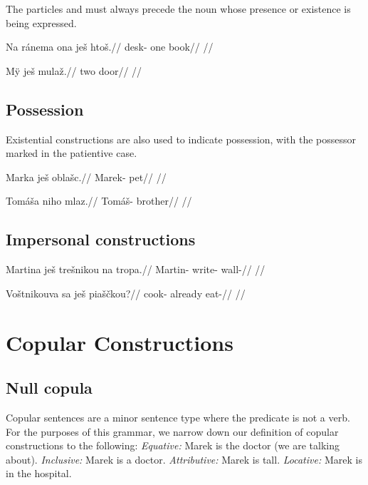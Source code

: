 The particles  and  must always precede the noun whose presence or existence is being expressed.

\pex
\begingl
\gla Na r\'anema ona je\v{s} hto\v{s}.//
\glb {} desk- one  book//
\glft {}//
\endgl
\xe

\pex
\begingl
\gla M\"y je\v{s} mula\v{z}.//
\glb two  door//
\glft {}//
\endgl
\xe



\subsection{Possession}
Existential constructions are also used to indicate possession, with the possessor marked in the patientive case.

\pex
\begingl
\gla Marka je\v{s} obla\v{s}c.//
\glb Marek-  pet//
\glft {}//
\endgl
\xe

\pex
\begingl
\gla Tom\'a\v{s}a niho mlaz.//
\glb Tom\'a\v{s}-  brother//
\glft {}//
\endgl
\xe

\subsection{Impersonal constructions}
\pex
\begingl
\gla Martina je\v{s} tre\v{s}nikou na tropa.//
\glb Martin-  write-  wall-//
\glft {}//
\endgl
\xe

\pex
\begingl
\gla Vo\v{s}tnikouva sa je\v{s} pia\v{s}\v{c}kou?//
\glb cook- already  eat-//
\glft {}//
\endgl
\xe

\section{Copular Constructions}
\subsection{Null copula}

Copular sentences are a minor sentence type where the predicate is not a verb. For the purposes of this grammar, we narrow down our definition of copular constructions to the following:
\pex
\a \textit{Equative:} Marek is the doctor (we are talking about).
\a \textit{Inclusive:} Marek is a doctor.
\a \textit{Attributive:} Marek is tall.
\a \textit{Locative:} Marek is in the hospital.
\xe

